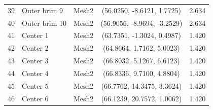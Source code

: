 \begin{table}[htbp]
\begin{tabular}{c l c c c}
    39 & Outer brim 9  & Mesh2 & (56.0250, -8.6121, 1.7725)  & 2.634 \\
    40 & Outer brim 10 & Mesh2 & (56.9056, -8.9694, -3.2529) & 2.634 \\
    41 & Center 1   & Mesh2 & (63.7351, -1.3024, 0.4987)  & 1.420 \\
    42 & Center 2   & Mesh2 & (64.8664, 1.7162, 5.0023)   & 1.420 \\
    43 & Center 3   & Mesh2 & (66.8032, 5.1267, 6.6123)   & 1.420 \\
    44 & Center 4   & Mesh2 & (66.8336, 9.7100, 4.8804)   & 1.420 \\
    45 & Center 5   & Mesh2 & (66.7762, 14.3475, 3.3624)  & 1.420 \\
    46 & Center 6   & Mesh2 & (66.1239, 20.7572, 1.0062)  & 1.420 \\
    \bottomrule
  \end{tabular}
\end{table}
